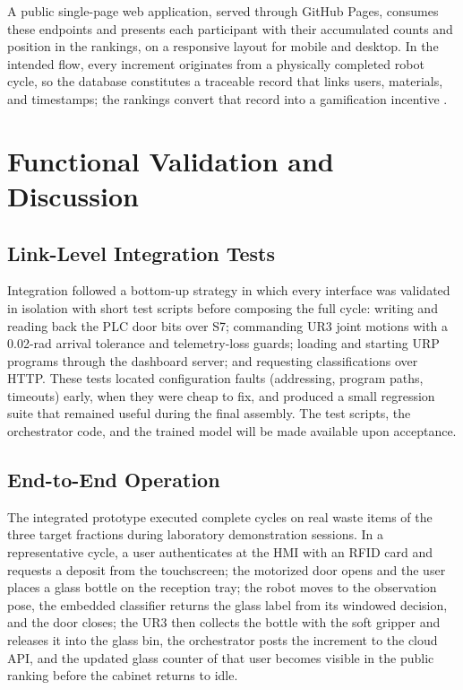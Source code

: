 \documentclass[conference]{IEEEtran}
\begin{document}
A public single-page web application, served through GitHub Pages, consumes these endpoints and presents each participant with their accumulated counts and position in the rankings, on a responsive layout for mobile and desktop. In the intended flow, every increment originates from a physically completed robot cycle, so the database constitutes a traceable record that links users, materials, and timestamps; the rankings convert that record into a gamification incentive \cite{b12}.

\section{Functional Validation and Discussion}
\subsection{Link-Level Integration Tests}
Integration followed a bottom-up strategy in which every interface was validated in isolation with short test scripts before composing the full cycle: writing and reading back the PLC door bits over S7; commanding UR3 joint motions with a 0.02-rad arrival tolerance and telemetry-loss guards; loading and starting URP programs through the dashboard server; and requesting classifications over HTTP. These tests located configuration faults (addressing, program paths, timeouts) early, when they were cheap to fix, and produced a small regression suite that remained useful during the final assembly. The test scripts, the orchestrator code, and the trained model will be made available upon acceptance.

\subsection{End-to-End Operation}
The integrated prototype executed complete cycles on real waste items of the three target fractions during laboratory demonstration sessions. In a representative cycle, a user authenticates at the HMI with an RFID card and requests a deposit from the touchscreen; the motorized door opens and the user places a glass bottle on the reception tray; the robot moves to the observation pose, the embedded classifier returns the glass label from its windowed decision, and the door closes; the UR3 then collects the bottle with the soft gripper and releases it into the glass bin, the orchestrator posts the increment to the cloud API, and the updated glass counter of that user becomes visible in the public ranking before the cabinet returns to idle.
\end{document}
